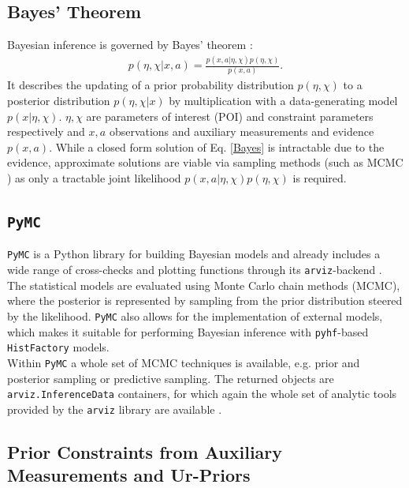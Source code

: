 \subsection{Bayes' Theorem}
Bayesian inference is governed by Bayes' theorem \cite{ConjPriorsBerkeley}:
    \begin{align} \label{Bayes}
        p(\eta, \chi \vert x, a) = \frac{p(x, a\vert \eta, \chi) p(\eta, \chi)}{p(x, a)}.
    \end{align}
 \noindent It describes the updating of a prior probability distribution $p(\eta, \chi)$ to a posterior distribution $p(\eta, \chi \vert x)$ by multiplication with a data-generating model $p(x \vert \eta, \chi)$. $\eta, \chi$ are parameters of interest (POI) and constraint parameters respectively and $x, a$ observations and auxiliary measurements and evidence $p(x, a)$. While a closed form solution of Eq. \eqref{Bayes} is intractable due to the evidence, approximate solutions are viable via sampling methods (such as MCMC \cite{PyMC}) as only a tractable joint likelihood $p(x, a \vert \eta, \chi)p(\eta, \chi)$ is required.

\subsection{\texttt{PyMC}}
\texttt{PyMC} is a Python library for building Bayesian models and already includes a wide range of cross-checks and plotting functions through its \texttt{arviz}-backend \cite{PyMC, arviz}. \\
\noindent The statistical models are evaluated using Monte Carlo chain methods (MCMC), where the posterior is represented by sampling from the prior distribution steered by the likelihood.
\noindent \texttt{PyMC} also allows for the implementation of external models, which makes it suitable for performing Bayesian inference with \texttt{pyhf}-based \texttt{HistFactory} models. \\
Within \texttt{PyMC} a whole set of MCMC techniques is available, e.g. prior and posterior sampling or predictive sampling. The returned objects are \texttt{arviz.InferenceData} containers, for which again the whole set of analytic tools provided by the \texttt{arviz} library are available \cite{arviz}.


\subsection{Prior Constraints from Auxiliary Measurements and Ur-Priors}

